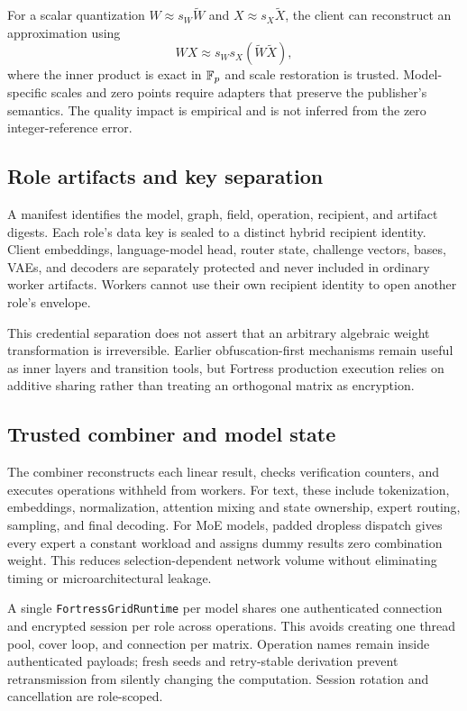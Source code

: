 For a scalar quantization $W\approx s_W\widetilde{W}$ and $X\approx s_X\widetilde{X}$, the client can reconstruct an approximation using
\begin{equation}
WX\approx s_Ws_X\left(\widetilde{W}\widetilde{X}\right),
\end{equation}
where the inner product is exact in $\mathbb{F}_{p}$ and scale restoration is trusted. Model-specific scales and zero points require adapters that preserve the publisher's semantics. The quality impact is empirical and is not inferred from the zero integer-reference error.

\subsection{Role artifacts and key separation}

A manifest identifies the model, graph, field, operation, recipient, and artifact digests. Each role's data key is sealed to a distinct hybrid recipient identity. Client embeddings, language-model head, router state, challenge vectors, bases, VAEs, and decoders are separately protected and never included in ordinary worker artifacts. Workers cannot use their own recipient identity to open another role's envelope.

This credential separation does not assert that an arbitrary algebraic weight transformation is irreversible. Earlier obfuscation-first mechanisms remain useful as inner layers and transition tools, but Fortress production execution relies on additive sharing rather than treating an orthogonal matrix as encryption.

\subsection{Trusted combiner and model state}

The combiner reconstructs each linear result, checks verification counters, and executes operations withheld from workers. For text, these include tokenization, embeddings, normalization, attention mixing and state ownership, expert routing, sampling, and final decoding. For MoE models, padded dropless dispatch gives every expert a constant workload and assigns dummy results zero combination weight. This reduces selection-dependent network volume without eliminating timing or microarchitectural leakage.

A single \texttt{FortressGridRuntime} per model shares one authenticated connection and encrypted session per role across operations. This avoids creating one thread pool, cover loop, and connection per matrix. Operation names remain inside authenticated payloads; fresh seeds and retry-stable derivation prevent retransmission from silently changing the computation. Session rotation and cancellation are role-scoped.

